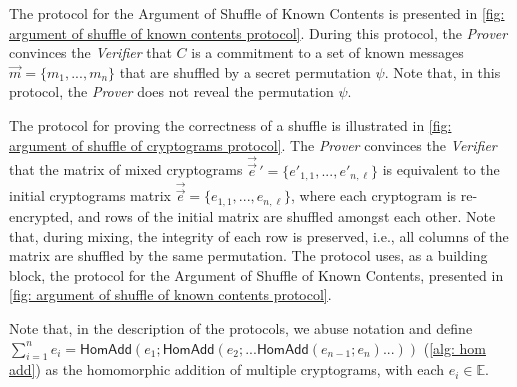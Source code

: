 The protocol for the Argument of Shuffle of Known Contents is presented in \cref{fig: argument of shuffle of known contents protocol}. During this protocol, the \textit{Prover} convinces the \textit{Verifier} that $C$ is a commitment to a set of known messages $\vec{m} = \{ m_1, ..., m_n \}$ that are shuffled by a secret permutation $\psi$. Note that, in this protocol, the \textit{Prover} does not reveal the permutation $\psi$.

The protocol for proving the correctness of a shuffle is illustrated in \cref{fig: argument of shuffle of cryptograms protocol}. The \textit{Prover} convinces the \textit{Verifier} that the matrix of mixed cryptograms $\vec{\vec{e}}\,' = \{ e'_{1, 1}, ..., e'_{n, \ell} \}$ is equivalent to the initial cryptograms matrix $\vec{\vec{e}} = \{ e_{1, 1}, ..., e_{n, \ell} \}$, where each cryptogram is re-encrypted, and rows of the initial matrix are shuffled amongst each other. Note that, during mixing, the integrity of each row is preserved, i.e., all columns of the matrix are shuffled by the same permutation. The protocol uses, as a building block, the protocol for the Argument of Shuffle of Known Contents, presented in \cref{fig: argument of shuffle of known contents protocol}.

Note that, in the description of the protocols, we abuse notation and define $\sum_{i=1}^n e_i = \mathsf{HomAdd}(e_1; \mathsf{HomAdd}(e_2; ... \mathsf{HomAdd}(e_{n-1}; e_n) ... ))$ (\cref{alg: hom add}) as the homomorphic addition of multiple cryptograms, with each $e_i \in \mathbb{E}$.

